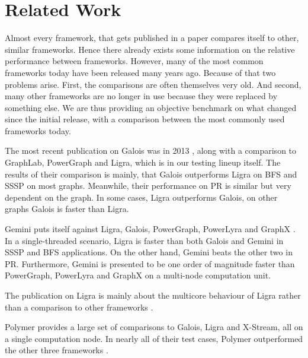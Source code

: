 

\section{Related Work}
Almost every framework, that gets published in a paper compares itself to other, similar frameworks. 
Hence there already exists some information on the relative performance between frameworks. 
However, many of the most common frameworks today have been released many years ago. 
Because of that two problems arise.
First, the comparisons are often themselves very old. 
And second, many other frameworks are no longer in use because they were replaced by something else.
We are thus providing an objective benchmark on what changed since the initial release, with a comparison between the most commonly used frameworks today. 

The most recent publication on Galois was in 2013 \cite{Galois}, along with a comparison to GraphLab, PowerGraph and Ligra, which is in our testing lineup itself. The results of their comparison is mainly, that Galois outperforms Ligra on BFS and SSSP on most graphs. Meanwhile, their performance on PR is similar but very dependent on the graph. In some cases, Ligra outperforms Galois, on other graphs Galois is faster than Ligra.

Gemini puts itself against Ligra, Galois, PowerGraph, PowerLyra and GraphX \cite{Gemini}.
In a single-threaded scenario, Ligra is faster than both Galois and Gemini in SSSP and BFS applications. 
On the other hand, Gemini beats the other two in PR.
Furthermore, Gemini is presented to be one order of magnitude faster than PowerGraph, PowerLyra and GraphX on a multi-node computation unit.

The publication on Ligra is mainly about the multicore behaviour of Ligra rather than a comparison to other frameworks \cite{Ligra}.

Polymer provides a large set of comparisons to Galois, Ligra and X-Stream, all on a single computation node. In nearly all of their test cases, Polymer outperformed the other three frameworks \cite{Polymer}. 



